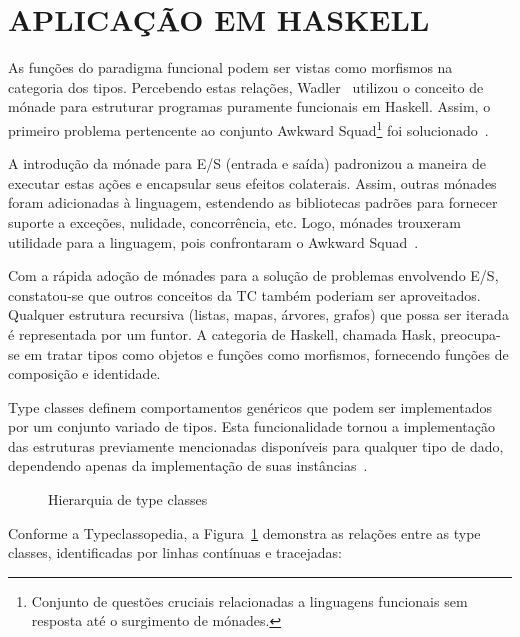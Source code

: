 \documentclass[10pt, conference]{IEEEtran}
\begin{document}
\bigskip

\section{APLICAÇÃO EM HASKELL}
\label{sec:hask-apply}
As funções do paradigma funcional podem ser vistas como morfismos na categoria dos tipos. Percebendo estas relações, Wadler~\cite{peyton1993imperative, wadler1995monads, wadler1992comprehending, wadler1992essence} utilizou o conceito de mónade para estruturar programas puramente funcionais em Haskell. Assim, o primeiro problema pertencente ao conjunto Awkward Squad\footnote{Conjunto de questões cruciais  relacionadas a linguagens funcionais sem resposta até o surgimento de mónades.} foi solucionado~\cite{jones2001tacklingthe}.

A introdução da mónade para E/S (entrada e saída) padronizou a maneira de executar  estas ações e encapsular seus efeitos colaterais. Assim, outras mónades foram adicionadas à linguagem, estendendo as bibliotecas padrões para fornecer suporte a exceções, nulidade, concorrência, etc. Logo, mónades trouxeram utilidade para a linguagem, pois confrontaram o Awkward Squad~\cite{jones2001tacklingthe}.

Com a rápida adoção de mónades para a solução de problemas envolvendo E/S, constatou-se que outros conceitos da TC também poderiam ser aproveitados. Qualquer estrutura recursiva (listas, mapas, árvores, grafos) que possa ser iterada é representada por um funtor. A categoria de Haskell, chamada Hask, preocupa-se em tratar tipos como objetos e funções como morfismos, fornecendo funções de composição e identidade.

Type classes definem comportamentos genéricos que podem ser implementados por um conjunto variado de tipos. Esta funcionalidade tornou a implementação das estruturas previamente mencionadas disponíveis para qualquer tipo de dado, dependendo apenas da implementação de suas instâncias~\cite{o2008real}.

\begin{figure}[h]
\centering
	\scalebox{.75}{
		
	}
	\bigskip
	\caption[Typeclass Hierarchy]{Hierarquia de type classes~\cite{web2015typeclassopedia}}
	\label{fig:typeclassopedia}
\end{figure}
	
Conforme a Typeclassopedia, a Figura~\ref{fig:typeclassopedia} demonstra as relações entre as type classes, identificadas por linhas contínuas e tracejadas:
\end{document}
